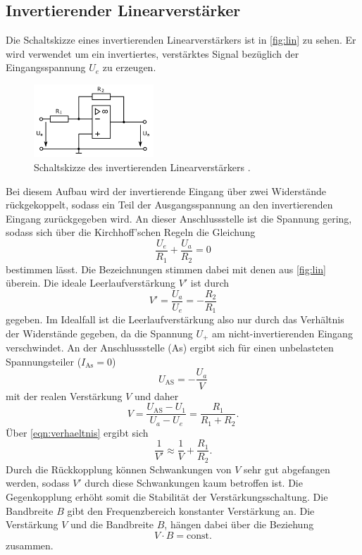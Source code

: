 \subsection{Invertierender Linearverstärker}
Die Schaltskizze eines invertierenden Linearverstärkers ist in \autoref{fig:lin} zu sehen. Er wird
verwendet um ein invertiertes, verstärktes Signal bezüglich der Eingangsspannung $U_e$ zu erzeugen.
\begin{figure}[H]
    \centering
    \includegraphics[width=0.4\textwidth]{linear.png}
    \caption{Schaltskizze des invertierenden Linearverstärkers \cite{anleitung}.}
    \label{fig:lin}
\end{figure}
Bei diesem Aufbau wird der invertierende Eingang über zwei Widerstände rückgekoppelt,
sodass ein Teil der
Ausgangsspannung an den invertierenden Eingang zurückgegeben wird. An dieser Anschlussstelle
ist die Spannung gering, sodass sich über die Kirchhoff'schen Regeln die Gleichung
\begin{equation*}
    \frac{U_e}{R_1} + \frac{U_a}{R_2} = 0
\end{equation*}
bestimmen lässt. Die Bezeichnungen stimmen dabei mit denen aus \autoref{fig:lin} überein.
Die ideale Leerlaufverstärkung $V'$ ist durch
\begin{equation}
    \label{eqn:verhaeltnis}
    V' = \frac{U_a}{U_e} = - \frac{R_2}{R_1}
\end{equation}
gegeben. Im Idealfall ist die Leerlaufverstärkung also nur durch das Verhältnis der Widerstände
gegeben, da die Spannung $U_+$ am nicht-invertierenden Eingang verschwindet.
An der Anschlussstelle (As) ergibt sich für einen unbelasteten Spannungsteiler ($I_\text{As}=0$)
\begin{equation*}
    U_\text{AS} = - \frac{U_a}{V}
\end{equation*}
mit der realen Verstärkung $V$ und daher
\begin{equation*}
   V =  \frac{U_\text{AS} - U_1}{U_a - U_e} = \frac{R_1}{R_1 + R_2}.
\end{equation*}
Über \autoref{eqn:verhaeltnis} ergibt sich
\begin{equation*}
    \frac{1}{V'} \approx \frac{1}{V} + \frac{R_1}{R_2}.
\end{equation*}
Durch die Rückkopplung können Schwankungen von $V$ sehr gut abgefangen werden, sodass
$V'$ durch diese Schwankungen kaum betroffen ist. Die Gegenkopplung erhöht somit die Stabilität
der Verstärkungsschaltung.
Die Bandbreite $B$ gibt den Frequenzbereich konstanter Verstärkung an.
Die Verstärkung $V$ und die Bandbreite $B$, hängen dabei über die Beziehung
\begin{equation*}
    V \cdot B = \text{const.}
\end{equation*}
zusammen.
